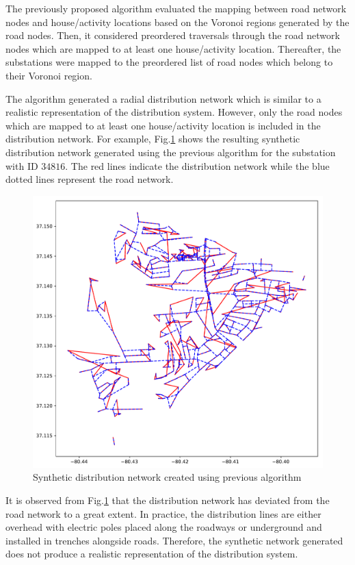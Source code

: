 \documentclass[12pt]{amsart}
\theoremstyle{definition}
\theoremstyle{remark} \newtheorem{remark}[theorem]{Remark} %
\numberwithin{equation}{section} %
\begin{document}
	\thispagestyle{fancy} \phantom{}
	The previously proposed algorithm evaluated the mapping between road network nodes and house/activity locations based on the Voronoi regions generated by the road nodes. Then, it considered preordered traversals through the road network nodes which are mapped to at least one house/activity location. Thereafter, the substations were mapped to the preordered list of road nodes which belong to their Voronoi region.
	
	The algorithm generated a radial distribution network which is similar to a realistic representation of the distribution system. However, only the road nodes which are mapped to at least one house/activity location is included in the distribution network. For example, Fig.\ref{fig:1} shows the resulting synthetic distribution network generated using the previous algorithm for the substation with ID $34816$. The red lines indicate the distribution network while the blue dotted lines represent the road network.
	\begin{figure}
		\centering
		\includegraphics[scale=0.4]{figs/fig1.pdf}
		\caption{Synthetic distribution network created using previous algorithm}
		\label{fig:1}
	\end{figure}
	
	It is observed from Fig.\ref{fig:1} that the distribution network has deviated from the road network to a great extent. In practice, the distribution lines are either overhead with electric poles placed along the roadways or underground and installed in trenches alongside roads. Therefore, the synthetic network generated does not produce a realistic representation of the distribution system. 
	
\end{document}
